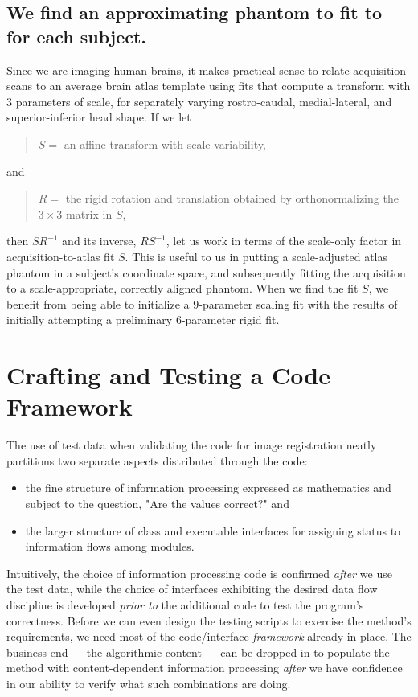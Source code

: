 \documentclass [10pt,twocolumn,twoside,final,letterpaper]{report}
\begin{document}
\section{We find an approximating phantom to fit to for each subject.}
Since we are imaging human brains, it makes practical sense to 
relate acquisition scans to an average brain atlas template using
fits that compute a transform with $3$ parameters of scale, for separately
varying rostro-caudal, medial-lateral, and superior-inferior head shape.
If we let
\begin{quotation}
 $S =$ an affine transform with scale variability,
\end{quotation}
and
\begin{quotation}
 $R =$ the rigid rotation and translation obtained by orthonormalizing the $3 \times{} 3$ matrix in $S$,
\end{quotation}
then $S R^{-1}$ and its inverse, $R S^{-1}$, let us work in terms of 
the scale-only factor in acquisition-to-atlas fit $S$.  This is useful to us in putting a
scale-adjusted atlas phantom in a subject's coordinate space, and
subsequently fitting the acquisition to a scale-appropriate, correctly
aligned phantom.  When we find the fit $S$,
we benefit from being able to initialize a $9$-parameter scaling fit
with the results of initially attempting a preliminary $6$-parameter rigid fit.


\chapter{Crafting and Testing a Code Framework} \label{sec:coding}

The use of test data when validating the code for image registration
neatly partitions two separate aspects distributed through the code:
\begin{itemize}
\item the fine structure of information processing 
expressed as mathematics and subject to the question, "Are the values correct?" and
\item the larger structure of class and executable interfaces
for assigning status to information flows among modules.
\end{itemize}

\vspace{0.25in}\par

Intuitively, the choice of information processing code 
is confirmed \emph{after} we use the test data, 
while the choice of interfaces exhibiting the desired data flow discipline
is developed \emph{prior to} the additional code to test the program's correctness.
Before we can even design the testing scripts to exercise the method's requirements, 
we need most of the code/interface \emph{framework} already in place.
The business end --- the algorithmic content --- 
can be dropped in to populate the method
with content-dependent information processing 
\emph{after} we have confidence in our ability to
verify what such combinations are doing.
\end{document}
